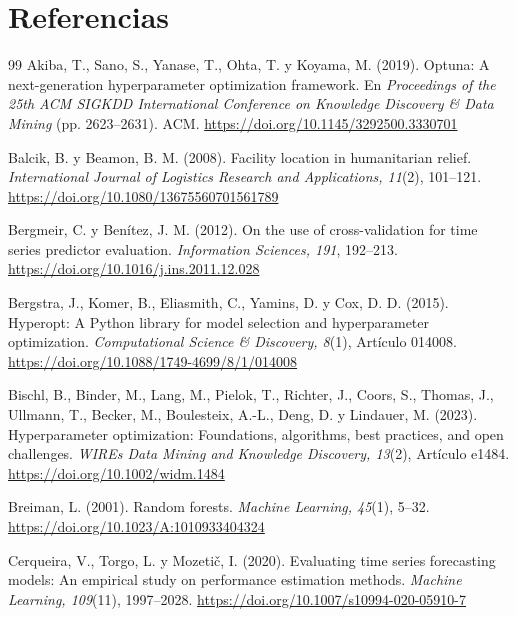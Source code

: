 \documentclass[12pt,a4paper]{article}
\begin{document}
\section*{Referencias}
\renewcommand{\refname}{}
\setlength{\bibsep}{6pt}
\setlength{\bibhang}{1.27cm}
\vspace{-1.2cm}
\begin{thebibliography}{99}\small
{}
Akiba, T., Sano, S., Yanase, T., Ohta, T. y Koyama, M. (2019). Optuna: A next-generation hyperparameter
optimization framework. En \emph{Proceedings of the 25th ACM SIGKDD International Conference on Knowledge Discovery
\& Data Mining} (pp. 2623--2631). ACM. \url{https://doi.org/10.1145/3292500.3330701}

Balcik, B. y Beamon, B. M. (2008). Facility location in humanitarian relief. \emph{International Journal of
Logistics Research and Applications, 11}(2), 101--121. \url{https://doi.org/10.1080/13675560701561789}

Bergmeir, C. y Benítez, J. M. (2012). On the use of cross-validation for time series predictor evaluation.
\emph{Information Sciences, 191}, 192--213. \url{https://doi.org/10.1016/j.ins.2011.12.028}

Bergstra, J., Komer, B., Eliasmith, C., Yamins, D. y Cox, D. D. (2015). Hyperopt: A Python library for model
selection and hyperparameter optimization. \emph{Computational Science \& Discovery, 8}(1), Artículo 014008.
\url{https://doi.org/10.1088/1749-4699/8/1/014008}

Bischl, B., Binder, M., Lang, M., Pielok, T., Richter, J., Coors, S., Thomas, J., Ullmann, T., Becker, M.,
Boulesteix, A.-L., Deng, D. y Lindauer, M. (2023). Hyperparameter optimization: Foundations, algorithms, best
practices, and open challenges. \emph{WIREs Data Mining and Knowledge Discovery, 13}(2), Artículo e1484.
\url{https://doi.org/10.1002/widm.1484}

Breiman, L. (2001). Random forests. \emph{Machine Learning, 45}(1), 5--32.
\url{https://doi.org/10.1023/A:1010933404324}

Cerqueira, V., Torgo, L. y Mozetič, I. (2020). Evaluating time series forecasting models: An empirical study on
performance estimation methods. \emph{Machine Learning, 109}(11), 1997--2028.
\url{https://doi.org/10.1007/s10994-020-05910-7}


\end{thebibliography}
\end{document}
